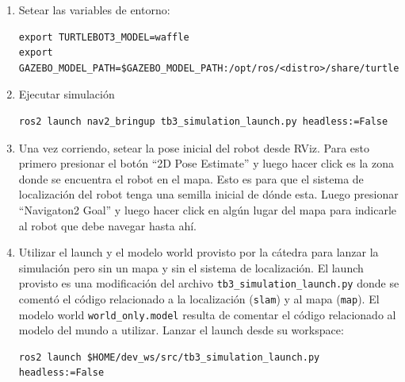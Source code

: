 \documentclass[tp]{lcc}
\begin{document}
\begin{enumerate}

\item Setear las variables de entorno:

\begin{lstlisting}[style=bash] 
export TURTLEBOT3_MODEL=waffle
export GAZEBO_MODEL_PATH=$GAZEBO_MODEL_PATH:/opt/ros/<distro>/share/turtlebot3_gazebo/models
\end{lstlisting}
	\item Ejecutar simulación

\begin{lstlisting}[style=bash] 
ros2 launch nav2_bringup tb3_simulation_launch.py headless:=False
\end{lstlisting}


	\item Una vez corriendo, setear la pose inicial del robot desde RViz. Para esto primero presionar el botón ``2D Pose Estimate'' y luego hacer click es la zona donde se encuentra el robot en el mapa. Esto es para que el sistema de localización del robot tenga una semilla inicial de dónde esta. Luego presionar ``Navigaton2 Goal'' y luego hacer click en algún lugar del mapa para indicarle al robot que debe navegar hasta ahí.

	
	\item Utilizar el launch y el modelo world provisto por la cátedra  para lanzar la simulación pero sin un mapa y sin el sistema de localización. El launch provisto es una modificación del  archivo \lstinline[style=bash]{tb3_simulation_launch.py} donde se comentó el código relacionado a la localización (\lstinline[style=bash]{slam}) y al mapa (\lstinline[style=bash]{map}). El modelo world \lstinline[style=bash]{world_only.model} resulta de comentar el código relacionado al modelo del mundo a utilizar. Lanzar el launch desde su workspace:
	
\begin{lstlisting}[style=bash] 
ros2 launch $HOME/dev_ws/src/tb3_simulation_launch.py headless:=False
\end{lstlisting}
	


\end{enumerate}
\end{document}
